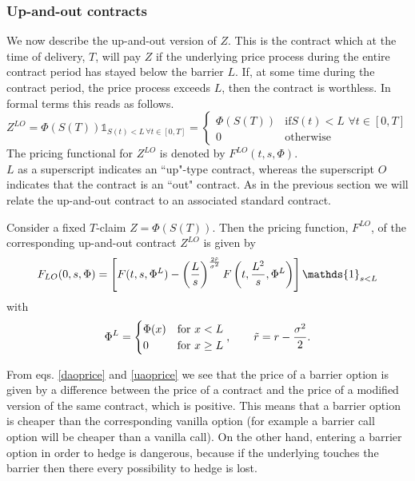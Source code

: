\subsubsection{Up-and-out contracts}
We now describe the up-and-out version of $Z$. This is the contract which at the time of delivery, $T$, will pay $Z$ if the underlying price process during the entire contract period has stayed below the barrier $L$. If, at some time during the contract period, the price process exceeds $L$, then the contract is worthless. In formal terms this reads as follows.
\begin{equation}
    Z^{LO} = \Phi(S(T))\mathds{1}_{S(t)<L\,\forall t\in[0,T]} =
    \begin{cases}
    \Phi(S(T)) & \text{if} S(t)<L\,\,\forall t\in[0,T] \\
    0 & \text{otherwise}
    \end{cases}
\end{equation}
The pricing functional for $Z^{LO}$ is denoted by $F^{LO}(t,s,\Phi)$.\\
$L$ as a superscript indicates an ``up"-type contract, whereas the superscript $O$ indicates that the contract is an ``out" contract. As in the previous section we will relate the up-and-out contract to an associated standard contract.
\begin{theorem}
    Consider a fixed $T$-claim $Z = \Phi(S(T))$. Then the pricing function, $F^{LO}$, of the corresponding up-and-out contract $Z^{LO}$ is given by
    \begin{equation}\label{uaoprice}
        F_{LO}(0,s,\Phi) =
        \left[F(t,s,\Phi^L) - \left(\dfrac{L}{s}\right)^{\frac{2\Tilde{r}}{\sigma^2}}F\left(t,\frac{L^2}{s},\Phi^L\right)\right]\mathds{1}_{s<L}
    \end{equation}
    with
    \begin{equation}
        \Phi^L =
        \begin{cases}
        \Phi(x) & \text{for }x<L \\
        0 & \text{for }x\ge L
        \end{cases},
        \qquad \Tilde{r} = r - \frac{\sigma^2}{2}.
    \end{equation}
\end{theorem}
\begin{remark}
    From eqs. \eqref{daoprice} and \eqref{uaoprice} we see that the price of a barrier option is given by a difference between the price of a contract and the price of a modified version of the same contract, which is positive. This means that a barrier option is cheaper than the corresponding vanilla option (for example a barrier call option will be cheaper than a vanilla call). On the other hand, entering a barrier option in order to hedge is dangerous, because if the underlying touches the barrier then there every possibility to hedge is lost.
\end{remark}

